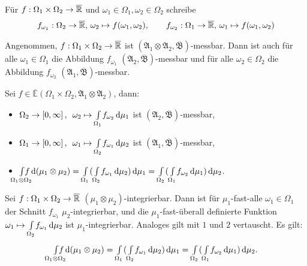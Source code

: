 \documentclass{cheat-sheet}
\newcommand{\Alg}{\mathfrak{A}} %
\newcommand{\Bor}{\mathfrak{B}} %
\newcommand{\E}{\mathbb{E}} %
\theoremstyle{definition}
\begin{document}
\begin{nota}
  Für $f : \Omega_1 \times \Omega_2 \to \overline{\mathbb{R}}$ und $\omega_1 \in \Omega_1, \omega_2 \in \Omega_2$ schreibe
  \begin{align*}
    f_{\omega_1} : \Omega_2 \to \overline{\mathbb{R}}, \, \omega_2 \mapsto f(\omega_1, \omega_2), \qquad
    f_{\omega_2} : \Omega_1 \to \overline{\mathbb{R}}, \, \omega_1 \mapsto f(\omega_1, \omega_2)
  \end{align*}
\end{nota}

\begin{lem}
  Angenommen, $f : \Omega_1 \times \Omega_2 \to \overline{\mathbb{R}}$ ist $(\Alg_1 \otimes \Alg_2, \overline{\Bor})$-messbar. Dann ist auch für alle $\omega_1 \in \Omega_1$ die Abbildung $f_{\omega_1}$ $(\Alg_2, \overline{\Bor})$-messbar und für alle $\omega_2 \in \Omega_2$ die Abbildung $f_{\omega_2}$ $(\Alg_1, \overline{\Bor})$-messbar.
\end{lem}

\begin{satz}
  Sei $f \in \overline{\E}(\Omega_1 \times \Omega_2, \Alg_1 \otimes \Alg_2)$, dann:
  \begin{itemize}
    \item $\Omega_2 \to \left[ 0, \infty \right], \enspace \omega_2 \mapsto {\textstyle \int\limits_{\Omega_1}^{}} f_{\omega_2} \,\mathrm{d} \mu_1$ \enspace ist $(\Alg_2, \overline{\Bor})$-messbar,
    \item $\Omega_1 \to \left[ 0, \infty \right], \enspace \omega_1 \mapsto {\textstyle \int\limits_{\Omega_2}^{}} f_{\omega_1} \,\mathrm{d} \mu_2$ \enspace ist $(\Alg_1, \overline{\Bor})$-messbar,
    \item \quad $\Int{\mathclap{\Omega_1 \otimes \Omega_2}}{}{f}{(\mu_1 \otimes \mu_2)} = \Int{\Omega_1}{}{(\Int{\Omega_2}{}{f_{\omega_1}}{\mu_2})}{\mu_1} = \Int{\Omega_2}{}{(\Int{\Omega_1}{}{f_{\omega_2}}{\mu_1})}{\mu_2}$.
  \end{itemize}
\end{satz}

\begin{satz}
  Sei $f : \Omega_1 \times \Omega_2 \to \overline{\mathbb{R}}$ $(\mu_1 \otimes \mu_2)$-integrierbar. Dann ist für $\mu_1$-fast-alle $\omega_1 \in \Omega_1$ der Schnitt $f_{\omega_1}$ $\mu_2$-integrierbar, und die $\mu_1$-fast-überall definierte Funktion $\omega_1 \mapsto {\textstyle \int\limits_{\Omega_2}^{}} f_{\omega_1} \,\mathrm{d} \mu_2$ ist $\mu_1$-integrierbar. Analoges gilt mit $1$ und $2$ vertauscht. Es gilt:
  \[ \Int{\mathclap{\Omega_1 \otimes \Omega_2}}{}{f}{(\mu_1 \otimes \mu_2)} = \Int{\Omega_1}{}{(\Int{\Omega_2}{}{f_{\omega_1}}{\mu_2})}{\mu_1} = \Int{\Omega_2}{}{(\Int{\Omega_1}{}{f_{\omega_2}}{\mu_1})}{\mu_2}. \]
\end{satz}
\end{document}
